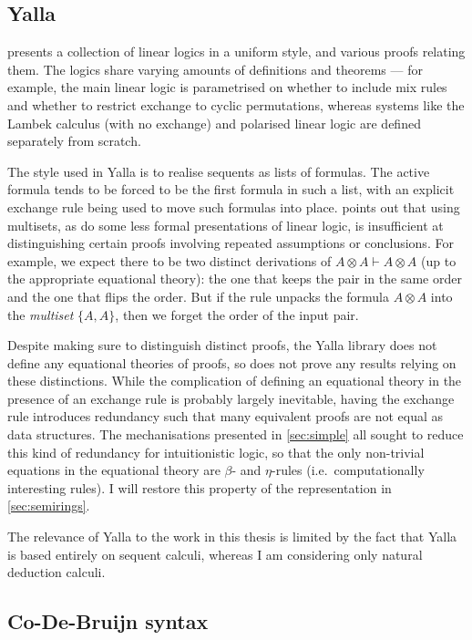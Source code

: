 \subsection{Yalla}

 presents a collection of linear logics in a uniform style, and
various proofs relating them.
The logics share varying amounts of definitions and theorems --- for example,
the main linear logic is parametrised on whether to include mix rules and
whether to restrict exchange to cyclic permutations, whereas systems like the
Lambek calculus (with no exchange) and polarised linear logic are defined
separately from scratch.

The style used in Yalla is to realise sequents as lists of formulas.
The active formula tends to be forced to be the first formula in such a list,
with an explicit exchange rule being used to move such formulas into place.
 points out that using multisets, as do some less formal
presentations of linear logic, is insufficient at distinguishing certain proofs
involving repeated assumptions or conclusions.
For example, we expect there to be two distinct derivations of
$A \otimes A \vdash A \otimes A$ (up to the appropriate equational theory):
the one that keeps the pair in the same order and the one that flips the order.
But if the  rule unpacks the formula $A \otimes A$ into the
\emph{multiset} $\{A, A\}$, then we forget the order of the input pair.

Despite making sure to distinguish distinct proofs, the Yalla library does not
define any equational theories of proofs, so does not prove any results relying
on these distinctions.
While the complication of defining an equational theory in the presence of an
exchange rule is probably largely inevitable, having the exchange rule
introduces redundancy such that many equivalent proofs are not equal as data
structures.
The mechanisations presented in \cref{sec:simple} all sought to reduce this kind
of redundancy for intuitionistic logic, so that the only non-trivial equations
in the equational theory are $\beta$- and $\eta$-rules (i.e.\ computationally
interesting rules).
I will restore this property of the representation in \cref{sec:semirings}.

The relevance of Yalla to the work in this thesis is limited by the fact that
Yalla is based entirely on sequent calculi, whereas I am considering only
natural deduction calculi.

\subsection{Co-De-Bruijn syntax}

